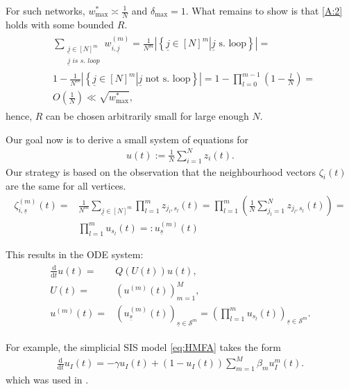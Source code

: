 \documentclass{article}
\renewcommand{\d}{\mathrm{d}}
\newcommand{\1}[1]{{\mathds{1}}_{\left\{#1\right\}}}
\renewcommand{\S}{\mathcal{S}}
\newcommand{\remm}[1]{{#1}}
\begin{document}
	
	For such networks, $\remm{w_{\max}^{*} \asymp}\frac{1}{N}$ and $\delta_{\max}=1$. What remains to show is that \eqref{A:2} holds with some bounded $R$.
	\begin{align}
		\label{eq:diag_bound}
		\begin{split}
			&\sum_{\substack{\underline{j} \in [N]^m \\ \underline{j} \textit{ is s.\ loop}}}w_{i, \underline{j}}^{(m)}= \frac{1}{N^m} \left|\left \{\left. \underline{j} \in [N]^m \right| \underline{j} \textrm{ s.\ loop} \right\} \right|=\\
			&1-\frac{1}{N^m} \left|\left \{\left. \underline{j} \in [N]^m \right| \underline{j} \textrm{ not s. loop} \right\} \right|=1-\prod_{l=0}^{m-1}\left(1-\frac{l}{N} \right)=\\
			&O \left(\frac{1}{N}\right) \ll \sqrt{\remm{w_{\max}^{*}}},
		\end{split}
	\end{align}
	hence, $R$ can be chosen arbitrarily small for large enough $N$.
	
	Our goal now is to derive a small system of equations for
	\begin{align*}
		u(t):=\frac{1}{N}\sum_{i=1}^N z_{i}(t).
	\end{align*}
	Our strategy is based on the observation that the neighbourhood vectors $\zeta_{i}(t)$ are the same for all vertices.
	\begin{align*}
		\zeta_{i,\underline{s}}^{(m)}(t)=&\frac{1}{N^m}\sum_{\underline{j} \in [N]^m} \prod_{l=1}^{m}z_{j_l,s_l}(t)=\prod_{l=1}^m \left(\frac{1}{N}\sum_{j_l=1}^N z_{j_l,s_l}(t) \right)=\\
		&\prod_{l=1}^{m}u_{s_l}(t)=:u_{\underline{s}}^{(m)}(t)
	\end{align*}
	
	This results in the ODE system: 
	\begin{align}
		\label{eq:HMFA}
		\begin{split}
			\frac{\d}{\d t}u(t)=& Q \left(U(t) \right)u(t),\\
			U(t)=& \left(u^{(m)}(t) \right)_{m=1}^M, \\
			u^{(m)}(t)=& \left(u_{\underline{s}}^{(m)}(t) \right)_{\underline{s}\in \S^m}=\left(\prod_{l=1}^{m}u_{s_l}(t) \right)_{\underline{s}\in \S^m}.
		\end{split}
	\end{align}
	
	For example, the simplicial SIS model \eqref{eq:HMFA} takes the form
	\begin{align*}
		\frac{\d}{\d t} u_{I}(t)=-\gamma u_{I}(t)+\left(1-u_{I}(t) \right)\sum_{m=1}^{M} \beta_{m}u_{I}^{m}(t). 
	\end{align*}
	which was used in \cite{simplicial2}.
	
\end{document}

